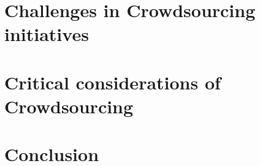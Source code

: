 \documentclass{sig-alternate}
\begin{document}
\section{Challenges in Crowdsourcing initiatives}

\section{Critical considerations of Crowdsourcing}


\section{Conclusion}



\end{document}
